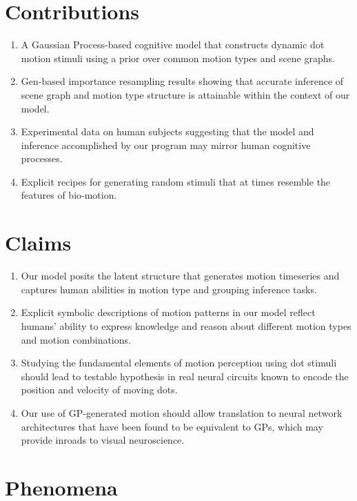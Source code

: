 \documentclass{scrartcl}
\begin{document}
\section*{Contributions}

\begin{enumerate}
  \item A Gaussian Process-based cognitive model that constructs dynamic dot motion stimuli using a prior over common motion types and scene graphs. \cite{Saad_2019}
  \item Gen-based importance resampling results showing that accurate inference of scene graph and motion type structure is attainable within the context of our model. 
  \item Experimental data on human subjects suggesting that the model and inference accomplished by our program may mirror human cognitive processes.
  \item Explicit recipes for generating random stimuli that at times resemble the features of bio-motion.

\end{enumerate}    

\section*{Claims}

\begin{enumerate}
  \item Our model posits the latent structure that generates motion timeseries and captures human abilities in motion type and grouping inference tasks.
  \item Explicit symbolic descriptions of motion patterns in our model reflect humans' ability to express knowledge and reason about different motion types and motion combinations.
  \item Studying the fundamental elements of motion perception using dot stimuli should lead to testable hypothesis in real neural circuits known to encode the position and velocity of moving dots. \cite{Bolton_2019}
  \item Our use of GP-generated motion should allow translation to neural network architectures that have been found to be equivalent to GPs, which may provide inroads to visual neuroscience. \cite{Neal_1996}
\end{enumerate}


\section*{Phenomena}
  
\end{document}
